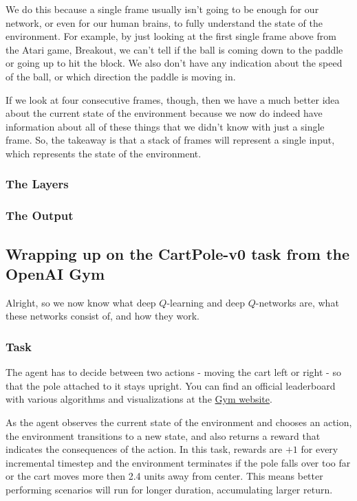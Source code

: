 We do this because a single frame usually isn't going to be enough for our network, 
or even for our human brains, to fully understand the state of the environment. For 
example, by just looking at the first single frame above from the Atari game, 
Breakout, we can't tell if the ball is coming down to the paddle or going up to hit 
the block. We also don't have any indication about the speed of the ball, or which 
direction the paddle is moving in.

If we look at four consecutive frames, though, then we have a much better idea about 
the current state of the environment because we now do indeed have information about 
all of these things that we didn't know with just a single frame. So, the takeaway 
is that a stack of frames will represent a single input, which represents the state 
of the environment.


\subsubsection{The Layers}


\subsubsection{The Output}


\subsection{Wrapping up on the CartPole-v0 task from the OpenAI Gym}


Alright, so we now know what deep $Q$-learning and deep $Q$-networks are, what these 
networks consist of, and how they work.

\subsubsection{Task}

The agent has to decide between two actions - moving the cart left or right - so that 
the pole attached to it stays upright. You can find an official leaderboard with 
various algorithms and visualizations at the 
\href{https://www.gymlibrary.ml/environments/classic_control/cart_pole}{Gym website}.

As the agent observes the current state of the environment and chooses an action, the 
environment transitions to a new state, and also returns a reward that indicates the 
consequences of the action. In this task, rewards are $+1$ for every incremental 
timestep and the environment terminates if the pole falls over too far or the cart 
moves more then 2.4 units away from center. This means better performing scenarios 
will run for longer duration, accumulating larger return.

